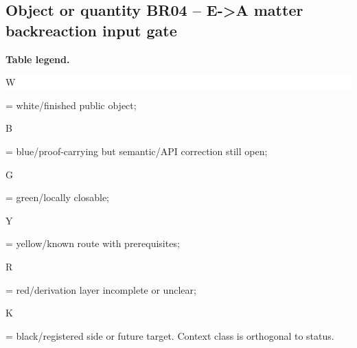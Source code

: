 \subsection*{Object or quantity BR04 -- E->A matter backreaction input gate}
\hypertarget{objproof:BR04}{}
\par\smallskip\noindent\begin{minipage}{0.99\linewidth}\footnotesize\raggedright\textbf{Table legend.} \colorbox{white}{\strut W} = white/finished public object; \colorbox{cyan!20}{\strut B} = blue/proof-carrying but semantic/API correction still open; \colorbox{green!18}{\strut G} = green/locally closable; \colorbox{yellow!25}{\strut Y} = yellow/known route with prerequisites; \colorbox{red!20}{\strut R} = red/derivation layer incomplete or unclear; \colorbox{black!18}{\strut K} = black/registered side or future target. Context class is orthogonal to status.\end{minipage}\par\vspace{0.25em}
